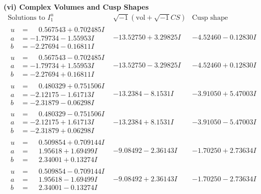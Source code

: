 \documentclass[1p]{elsarticle_modified}
\theoremstyle{definition}
\newcommand{\I}{\sqrt{-1}}
\begin{document}
\newpage\flushleft \textbf{(vi) Complex Volumes and Cusp Shapes}
$$\begin{array}{c|c|c}  
\text{Solutions to }I^u_{1}& \I (\text{vol} + \sqrt{-1}CS) & \text{Cusp shape}\\
 \hline 
\begin{aligned}
u &= \phantom{-}0.567543 + 0.702485 I \\
a &= -1.79734 - 1.55953 I \\
b &= -2.27694 - 0.16811 I\end{aligned}
 & -13.52750 + 3.29825 I & -4.52460 - 0.12830 I \\ \hline\begin{aligned}
u &= \phantom{-}0.567543 - 0.702485 I \\
a &= -1.79734 + 1.55953 I \\
b &= -2.27694 + 0.16811 I\end{aligned}
 & -13.52750 - 3.29825 I & -4.52460 + 0.12830 I \\ \hline\begin{aligned}
u &= \phantom{-}0.480329 + 0.751506 I \\
a &= -2.12175 - 1.61713 I \\
b &= -2.31879 - 0.06298 I\end{aligned}
 & -13.2384 - 8.1531 I & -3.91050 + 5.47003 I \\ \hline\begin{aligned}
u &= \phantom{-}0.480329 - 0.751506 I \\
a &= -2.12175 + 1.61713 I \\
b &= -2.31879 + 0.06298 I\end{aligned}
 & -13.2384 + 8.1531 I & -3.91050 - 5.47003 I \\ \hline\begin{aligned}
u &= \phantom{-}0.509854 + 0.709144 I \\
a &= \phantom{-}1.95618 + 1.69499 I \\
b &= \phantom{-}2.34001 + 0.13274 I\end{aligned}
 & -9.08492 - 2.36143 I & -1.70250 + 2.73634 I \\ \hline\begin{aligned}
u &= \phantom{-}0.509854 - 0.709144 I \\
a &= \phantom{-}1.95618 - 1.69499 I \\
b &= \phantom{-}2.34001 - 0.13274 I\end{aligned}
 & -9.08492 + 2.36143 I & -1.70250 - 2.73634 I \\ \hline\begin{aligned}

\end{aligned}
\end{array}$$
\end{document}
